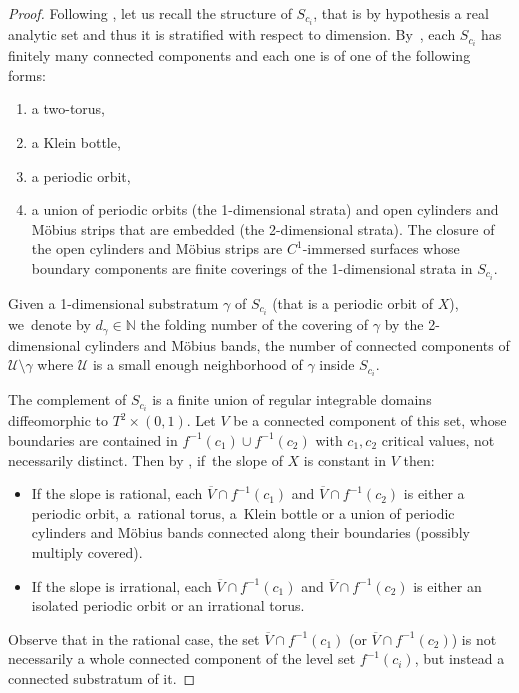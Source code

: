 \documentclass[10pt]{amsart}
\theoremstyle{definition}
\begin{document}
\begin{proof}
Following \cite{CV2}, let us recall the structure of $S_{c_i}$, that is by hypothesis a real analytic set and thus it is stratified with respect to dimension. By~\cite[Prop.\,2.6]{CV2}, each $S_{c_i}$ has finitely many connected components and each one is of one of the following forms:
\begin{enumerate}
\item a two-torus,
\item a Klein bottle,
\item a periodic orbit,
\item a union of periodic orbits (the 1-dimensional strata) and open cylinders and Möbius strips that are embedded (the 2-dimensional strata). The closure of the open cylinders and Möbius strips are $C^1$-immersed surfaces whose boundary components are finite coverings of the 1-dimensional strata in $S_{c_i}$.
\end{enumerate}
Given a 1-dimensional substratum $\gamma$ of $S_{c_i}$ (that is a periodic orbit of $X$), we~denote by $d_{\gamma}\in \mathbb{N}$ the folding number of the covering of $\gamma$ by the 2-dimensional cylinders and Möbius bands, \ie the number of connected components of $\mathcal{U}\setminus \gamma$ where $\mathcal{U}$ is a small enough neighborhood of $\gamma$ inside $S_{c_i}$.

The complement of $S_{c_i}$ is a finite union of regular integrable domains diffeomorphic to $T^2\times (0,1)$. Let $V$ be a connected component of this set, whose boundaries are contained in $f^{-1}(c_1)\cup f^{-1}(c_2)$ with $c_1,c_2$ critical values, not necessarily distinct. Then by \cite[Lem.\,3.4]{CV2}, if~the slope of $X$ is constant in $V$ then:
\begin{itemize}
\item
If the slope is rational, each $\overline{V}\cap f^{-1}(c_1)$ and $\overline{V}\cap f^{-1}(c_2)$ is either a periodic orbit, a~rational torus, a~Klein bottle or a union of periodic cylinders and Möbius bands connected along their boundaries (possibly multiply covered).
\item
If the slope is irrational, each $\overline{V}\cap f^{-1}(c_1)$ and $\overline{V}\cap f^{-1}(c_2)$ is either an isolated periodic orbit or an irrational torus.
\end{itemize}
Observe that in the rational case, the set $\overline{V}\cap f^{-1}(c_1)$ (or $\overline{V}\cap f^{-1}(c_2)$) is not necessarily a whole connected component of the level set $f^{-1}(c_i)$, but instead a connected substratum of it.


\end{proof}
\end{document}
